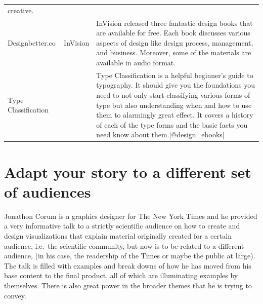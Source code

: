 \documentclass[]{book}
\theoremstyle{definition}
\theoremstyle{definition}
\theoremstyle{definition}
\theoremstyle{remark}
\begin{document}
\begin{longtable}[]{@{}lll@{}}
\begin{minipage}[t]{0.72\columnwidth}
creative.\strut
\end{minipage}\tabularnewline
\begin{minipage}[t]{0.08\columnwidth}\raggedright\strut
Designbetter.co\strut
\end{minipage} & \begin{minipage}[t]{0.11\columnwidth}\raggedright\strut
InVision\strut
\end{minipage} & \begin{minipage}[t]{0.72\columnwidth}\raggedright\strut
InVision released three fantastic design books that are available for
free. Each book discusses various aspects of design like design process,
management, and business. Moreover, some of the materials are available
in audio format.\strut
\end{minipage}\tabularnewline
\begin{minipage}[t]{0.08\columnwidth}\raggedright\strut
Type Classification\strut
\end{minipage} & \begin{minipage}[t]{0.11\columnwidth}\raggedright\strut
\strut
\end{minipage} & \begin{minipage}[t]{0.72\columnwidth}\raggedright\strut
Type Classification is a helpful beginner's guide to typography. It
should give you the foundations you need to not only start classifying
various forms of type but also understanding when and how to use them to
alarmingly great effect. It covers a history of each of the type forms
and the basic facts you need know about them.{[}@design\_ebooks{]}\strut
\end{minipage}\tabularnewline
\bottomrule
\end{longtable}

\section{Adapt your story to a different set of
audiences}\label{adapt-your-story-to-a-different-set-of-audiences}

Jonathon Corum is a graphics designer for The New York Times and he
provided a very informative talk to a strictly scientific audience on
how to create and design visualizations that explain material originally
created for a certain audience, i.e.~the scientific community, but now
is to be related to a different audience, (in his case, the readership
of the Times or maybe the public at large). The talk is filled with
examples and break downs of how he has moved from his base content to
the final product, all of which are illuminating examples by themselves.
There is also great power in the broader themes that he is trying to
convey.
\end{document}
